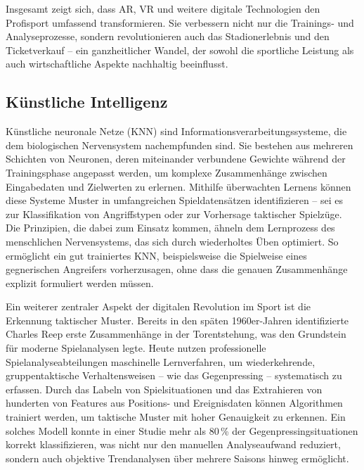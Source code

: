 \documentclass[
  number]{elsarticle}
\begin{document}
Insgesamt zeigt sich, dass AR, VR und weitere digitale Technologien den
Profisport umfassend transformieren. Sie verbessern nicht nur die
Trainings- und Analyseprozesse, sondern revolutionieren auch das
Stadionerlebnis und den Ticketverkauf -- ein ganzheitlicher Wandel, der
sowohl die sportliche Leistung als auch wirtschaftliche Aspekte
nachhaltig beeinflusst.

\subsection{Künstliche Intelligenz}\label{kuxfcnstliche-intelligenz}

Künstliche neuronale Netze (KNN) sind Informationsverarbeitungssysteme,
die dem biologischen Nervensystem nachempfunden sind. Sie bestehen aus
mehreren Schichten von Neuronen, deren miteinander verbundene Gewichte
während der Trainingsphase angepasst werden, um komplexe Zusammenhänge
zwischen Eingabedaten und Zielwerten zu erlernen. Mithilfe überwachten
Lernens können diese Systeme Muster in umfangreichen Spieldatensätzen
identifizieren -- sei es zur Klassifikation von Angriffstypen oder zur
Vorhersage taktischer Spielzüge. Die Prinzipien, die dabei zum Einsatz
kommen, ähneln dem Lernprozess des menschlichen Nervensystems, das sich
durch wiederholtes Üben optimiert. So ermöglicht ein gut trainiertes
KNN, beispielsweise die Spielweise eines gegnerischen Angreifers
vorherzusagen, ohne dass die genauen Zusammenhänge explizit formuliert
werden müssen. \citep[pp.~190--196]{memmert_sportinformatik}

Ein weiterer zentraler Aspekt der digitalen Revolution im Sport ist die
Erkennung taktischer Muster. Bereits in den späten 1960er-Jahren
identifizierte Charles Reep erste Zusammenhänge in der Torentstehung,
was den Grundstein für moderne Spielanalysen legte. Heute nutzen
professionelle Spielanalyseabteilungen maschinelle Lernverfahren, um
wiederkehrende, gruppentaktische Verhaltensweisen -- wie das
Gegenpressing -- systematisch zu erfassen. Durch das Labeln von
Spielsituationen und das Extrahieren von hunderten von Features aus
Positions- und Ereignisdaten können Algorithmen trainiert werden, um
taktische Muster mit hoher Genauigkeit zu erkennen. Ein solches Modell
konnte in einer Studie mehr als 80\,\% der Gegenpressingsituationen
korrekt klassifizieren, was nicht nur den manuellen Analyseaufwand
reduziert, sondern auch objektive Trendanalysen über mehrere Saisons
hinweg ermöglicht. \citep[pp.~256-263]{memmert_spielanalyse}
\end{document}
